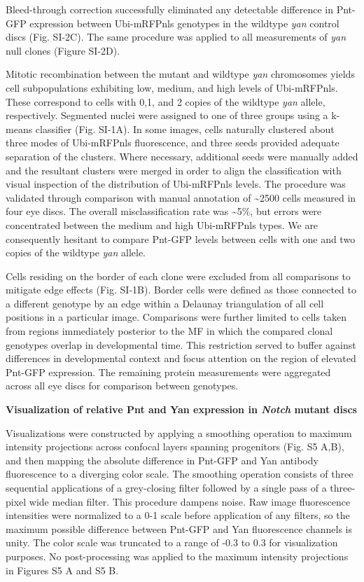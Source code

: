 Bleed-through correction successfully eliminated any detectable difference in Pnt-GFP expression between Ubi-mRFPnls genotypes in the wildtype \emph{yan} control discs (Fig. SI-2C). The same procedure was applied to all measurements of \emph{yan} null clones (Figure SI-2D).

Mitotic recombination between the mutant and wildtype \emph{yan} chromosomes yields cell subpopulations exhibiting low, medium, and high levels of Ubi-mRFPnls. These correspond to cells with 0,1, and 2 copies of the wildtype \emph{yan} allele, respectively. Segmented nuclei were assigned to one of three groups using a k-means classifier (Fig. SI-1A). In some images, cells naturally clustered about three modes of Ubi-mRFPnls fluorescence, and three seeds provided adequate separation of the clusters. Where necessary, additional seeds were manually added and the resultant clusters were merged in order to align the classification with visual inspection of the distribution of Ubi-mRFPnls levels. The procedure was validated through comparison with manual annotation of \textasciitilde{}2500 cells measured in four eye discs. The overall misclassification rate was \textasciitilde{}5\%, but errors were concentrated between the medium and high Ubi-mRFPnls types. We are consequently hesitant to compare Pnt-GFP levels between cells with one and two copies of the wildtype \emph{yan} allele.

Cells residing on the border of each clone were excluded from all comparisons to mitigate edge effects (Fig. SI-1B). Border cells were defined as those connected to a different genotype by an edge within a Delaunay triangulation of all cell positions in a particular image. Comparisons were further limited to cells taken from regions immediately posterior to the MF in which the compared clonal genotypes overlap in developmental time. This restriction served to buffer against differences in developmental context and focus attention on the region of elevated Pnt-GFP expression. The remaining protein measurements were aggregated across all eye discs for comparison between genotypes.

\textbf{Visualization of relative Pnt and Yan expression in \emph{Notch} mutant discs}

Visualizations were constructed by applying a smoothing operation to maximum intensity projections across confocal layers spanning progenitors (Fig. S5 A,B), and then mapping the absolute difference in Pnt-GFP and Yan antibody fluorescence to a diverging color scale. The smoothing operation consists of three sequential applications of a grey-closing filter followed by a single pass of a three-pixel wide median filter. This procedure dampens noise. Raw image fluorescence intensities were normalized to a 0-1 scale before application of any filters, so the maximum possible difference between Pnt-GFP and Yan fluorescence channels is unity. The color scale was truncated to a range of -0.3 to 0.3 for visualization purposes. No post-processing was applied to the maximum intensity projections in Figures S5 A and S5 B.

